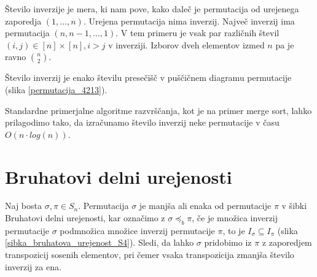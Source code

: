 \documentclass[a4paper, 12pt]{book}
\begin{document}
Število inverzije je mera, ki nam pove, kako daleč je permutacija od urejenega zaporedja $(1, ..., n)$. Urejena permutacija nima inverzij. Največ inverzij ima permutacija $(n, n-1, ..., 1)$. V tem primeru je vsak par različnih števil $(i, j) \in [n] \times [n], i > j$ v inverziji. Izborov dveh elementov izmed $n$ pa je ravno $\binom{n}{2}$.

Število inverzij je enako številu presečišč v puščičnem diagramu permutacije (slika \ref{permutacija_4213}).

Standardne primerjalne algoritme razvrščanja, kot je na primer merge sort, lahko prilagodimo tako, da izračunamo število inverzij neke permutacije v času $O(n \cdot log(n))$.

\section{ Bruhatovi delni urejenosti }
Naj bosta $\sigma, \pi \in S_n$. Permutacija $\sigma$ je manjša ali enaka od permutacije $\pi$ v šibki Bruhatovi delni urejenosti, kar označimo z $\sigma \preceq_b \pi$, če je množica inverzij permutacije $\sigma$ podmnožica množice inverzij permutacije $\pi$, to je $I_{\sigma} \subseteq I_{\pi}$ (slika \ref{sibka_bruhatova_urejenost_S4}). Sledi, da lahko $\sigma$ pridobimo iz $\pi$ z zaporedjem transpozicij sosenih elementov, pri čemer vsaka transpozicija zmanjša število inverzij za ena.
\end{document}

